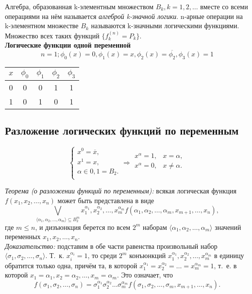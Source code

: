 \documentclass[a4paper,12pt]{report}
\begin{document}
	Алгебра, образованная k-элементным множеством $ B_k, k = 1, 2, \dots $ вместе
	со всеми операциями на нём называется \textit{алгеброй k-значной логики}.
	n-арные операции на k-элементном множестве $ B_k $ называются k-значными
	логическими функциями. Множество всех таких функций $ \{f^{(n)}_k = P_k \} $.
	\\

	\textbf{Логические функции одной переменной}
	$$ n = 1; \phi_0(x) = 0, \phi_1(x) = x, \phi_2(x) = \overline{\phi_2},
	\phi_3(x) = 1 $$

	\begin{center}
		\begin{tabular}{ | c || c | c | c | c | }
			\hline
			$x$ & $\phi_0$ & $\phi_1$ & $\phi_2$ & $\phi_3$ \\
			\hline
			\hline
			0 & 0 & 0 & 1 & 1 \\
			\hline
			1 & 0 & 1 & 0 & 1 \\
			\hline
		\end{tabular}
	\end{center}

\subsection{Разложение логических функций по переменным}
	$$
	\begin{cases}
		x^0 = \overline{x}, \\
		x^1 = x, \\
		\alpha \in 0, 1 = B_2. \\
	\end{cases}
	\Rightarrow
	\begin{aligned}
		x^{\alpha} = 1, & x = \alpha,\\
		x^{\alpha} = 0, & x \neq \alpha.\\
	\end{aligned}
	$$

	\textit{Теорема (о разложении функций по переменным):} всякая логическая
	функция $ f(x_1, x_2, \dots, x_n) $ может быть представлена в виде
	$$ \bigvee_{\langle \alpha_1, \alpha_2, \dots, \alpha_m \rangle \subseteq
	B^m_2}
	x^{\alpha_1}_1, x^{\alpha_2}_2, \dots, x^{\alpha_m}_m
	f(\alpha_1, \alpha_2, \dots, \alpha_m, x_{m+1}, \dots, x_n),$$
	где $ m \leq n $, и дизъюнкция берется по всем $ 2^m $ наборам $ \langle
	\alpha_1, \alpha_2, \dots, \alpha_m \rangle $ значений переменных $ x_1, x_2,
	\dots, x_n $.\\

	\textit{Доказательство:} подставим в обе части равенства произвольный набор
	$ \langle \sigma_1, \sigma_2, \dots, \sigma_n \rangle $. Т.~к.
	$ x^{\alpha_i}_i = 1 $, то среди $ 2^m $ конъюнкций $ x^{\alpha_1}_1,
	x^{\alpha_2}_2, \dots, x^{\alpha_m}_m $ в единицу обратится только одна,
	причём та, в которой $ x^{\alpha_1}_1 = x^{\alpha_2}_2 = \dots =
	x^{\alpha_m}_m = 1 $, т.~е. в которой $ x_1 = \alpha_1, x_2 = \alpha_2,
	\dots, x_m = \alpha_m $. Это означает, что
	$$ f(\sigma_1, \sigma_2, \dots, \sigma_n) =
	\sigma_1^{\alpha_1} \sigma_2^{\alpha_2} \dots \sigma_m^{\alpha_m}
	f(\sigma_1, \sigma_2, \dots, \sigma_m, x_{m+1}, \dots, x_n). $$
\end{document}

